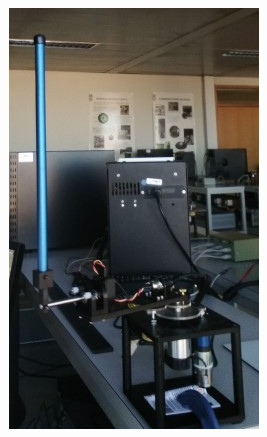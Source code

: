 \documentclass[a4paper,11pt]{article}
\theoremstyle{definition} \newtheorem{deff}{Definicija}[section]
\theoremstyle{definition} \newtheorem{prim}[deff]{Primer}
\theoremstyle{plain} \newtheorem{teor}[deff]{Teorema}
\begin{document}
	\begin{figure}[!htb]
		\centering
		\begin{subfigure}{0.3\linewidth}
			\centering
			\includegraphics[width=\linewidth]{slike/eksperiment.jpg}
			\caption{}
			\label{fig:eksper}
		\end{subfigure}
		\hfill
		\begin{subfigure}{0.5\linewidth}
			\centering

\end{subfigure}
\end{figure}
\end{document}
